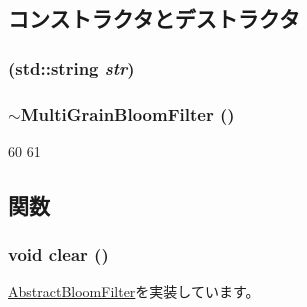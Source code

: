 \subsection{コンストラクタとデストラクタ}
\hypertarget{classMultiGrainBloomFilter_adbc5ba0875a5e7782e2b354b98b4941f}{
\subsubsection[{MultiGrainBloomFilter}]{ (std::string {\em str})}}
\label{classMultiGrainBloomFilter_adbc5ba0875a5e7782e2b354b98b4941f}
\hypertarget{classMultiGrainBloomFilter_a308a18f368d63eed598f895332c14f6e}{
\subsubsection[{$\sim$MultiGrainBloomFilter}]{\setlength{\rightskip}{0pt plus 5cm}$\sim${\bf MultiGrainBloomFilter} ()}}
\label{classMultiGrainBloomFilter_a308a18f368d63eed598f895332c14f6e}



\begin{DoxyCode}
60 {
61 }
\end{DoxyCode}


\subsection{関数}
\hypertarget{classMultiGrainBloomFilter_ac8bb3912a3ce86b15842e79d0b421204}{
\subsubsection[{clear}]{\setlength{\rightskip}{0pt plus 5cm}void clear ()}}
\label{classMultiGrainBloomFilter_ac8bb3912a3ce86b15842e79d0b421204}


\hyperlink{classAbstractBloomFilter_a5eeb94d22b8366d1b68d0614384802fe}{AbstractBloomFilter}を実装しています。


